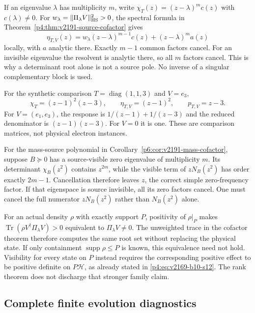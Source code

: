 \documentclass[12pt,a4paper]{article}
\begin{document}
If an eigenvalue $\lambda$ has multiplicity $m$, write
$\chi_T(z)=(z-\lambda)^m c(z)$ with $c(\lambda)\ne0$.
For $w_\lambda=\|\Pi_\lambda V\|_{\rm HS}^2>0$, the spectral formula in
Theorem~\ref{p4:thm:v2191-source-cofactor} gives
\[
 \eta_{T,V}(z)
  =w_\lambda(z-\lambda)^{m-1}c(z)
     +(z-\lambda)^m a(z)
\]
locally, with $a$ analytic there. Exactly $m-1$ common factors cancel.
For an invisible eigenvalue the resolvent is analytic there, so all $m$
factors cancel. This is why a determinant root alone is not a source pole.
No inverse of a singular complementary block is used.

For the synthetic comparison $T=\operatorname{diag}(1,1,3)$ and $V=e_3$,
\[
 \chi_T=(z-1)^2(z-3),\qquad
 \eta_{T,V}=(z-1)^2,\qquad p_{T,V}=z-3.
\]
For $V=(e_1,e_3)$, the response is
$1/(z-1)+1/(z-3)$ and the reduced denominator is
$(z-1)(z-3)$. For $V=0$ it is one. These are comparison matrices, not
physical electron instances.

For the mass-source polynomial in
Corollary~\ref{p6:cor:v2191-mass-cofactor}, suppose $B\succeq0$ has a
source-visible zero eigenvalue of multiplicity $m$. Its determinant
$\chi_B(z^2)$ contains $z^{2m}$, while the visible term of
$zN_B(z^2)$ has order exactly $2m-1$. Cancellation therefore leaves
$z$, the correct simple zero-frequency factor. If that eigenspace is
source invisible, all its zero factors cancel. One must cancel the full
numerator $zN_B(z^2)$ rather than $N_B(z^2)$ alone.

For an actual density $\rho$ with exactly support $P$, positivity of
$\rho|_P$ makes
$\operatorname{Tr}(\rho V^\dagger\Pi_\lambda V)>0$ equivalent to
$\Pi_\lambda V\ne0$. The unweighted trace in the cofactor theorem
therefore computes the same root set without replacing the physical state.
If only containment $\operatorname{supp}\rho\le P$ is known, this
equivalence need not hold. Visibility for every state on $P$ instead
requires the corresponding positive effect to be positive definite on
$P\mathcal H$, as already stated in
\eqref{p4:eq:v2169-b10-s12}. The rank theorem does not discharge that
stronger family claim.





\subsection{Complete finite evolution diagnostics}
\label{p4:app:v2190-evolution-diagnostics}
\end{document}
